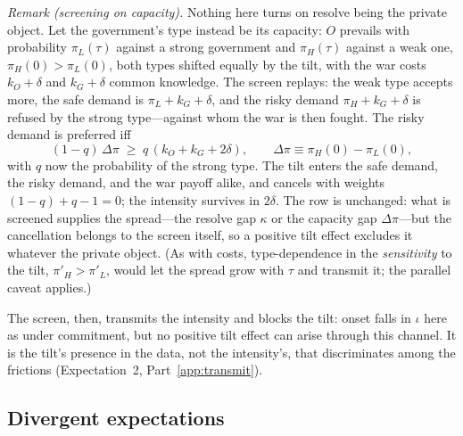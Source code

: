 \emph{Remark (screening on capacity).}  Nothing here turns on resolve being
the private object.  Let the government's type instead be its capacity: $O$
prevails with probability $\pi_L(\tau)$ against a strong government and
$\pi_H(\tau)$ against a weak one, $\pi_H(0) > \pi_L(0)$, both types shifted
equally by the tilt, with the war costs $k_O + \delta$ and $k_G + \delta$
common knowledge.  The screen replays: the weak type accepts more, the safe
demand is $\pi_L + k_G + \delta$, and the risky demand $\pi_H + k_G + \delta$
is refused by the strong type---against whom the war is then fought.  The
risky demand is preferred iff
\[
  (1 - q)\,\Delta\pi \;\ge\; q\,(k_O + k_G + 2\delta), \qquad
  \Delta\pi \equiv \pi_H(0) - \pi_L(0),
\]
with $q$ now the probability of the strong type.  The tilt enters the safe
demand, the risky demand, and the war payoff alike, and cancels with weights
$(1 - q) + q - 1 = 0$; the intensity survives in $2\delta$.  The row is
unchanged: what is screened supplies the spread---the resolve gap $\kappa$ or
the capacity gap $\Delta\pi$---but the cancellation belongs to the screen
itself, so a positive tilt effect excludes it whatever the private object.
(As with costs, type-dependence in the \emph{sensitivity} to the tilt,
$\pi'_H > \pi'_L$, would let the spread grow with $\tau$ and transmit it; the
parallel caveat applies.)

The screen, then, transmits the intensity and blocks the tilt: onset falls in
$\iota$ here as under commitment, but no positive tilt effect can arise
through this channel.  It is the tilt's presence in the data, not the
intensity's, that discriminates among the frictions (Expectation~2, Part~\ref{app:transmit}).

\subsection{Divergent expectations}
\label{app:diverge}

